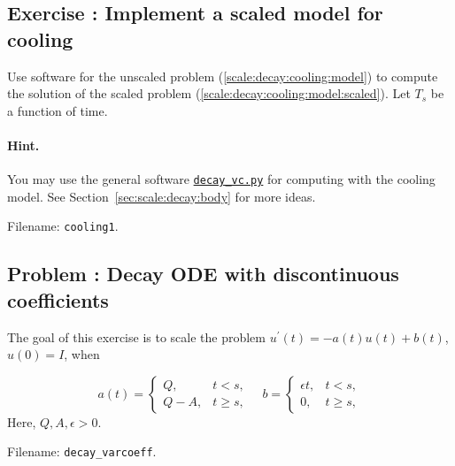 \documentclass[graybox,envcountchap,sectrefs,final]{svmonodo}
\newenvironment{doconceexercise}{}{}
\newcounter{doconceexercisecounter}
\begin{document}
\begin{doconceexercise}

\subsection*{Exercise \thedoconceexercisecounter: Implement a scaled model for cooling}

\label{sec:scale:exer:decay:cooling}

Use software for the unscaled problem (\ref{scale:decay:cooling:model})
to compute the solution of the
scaled problem (\ref{scale:decay:cooling:model:scaled}).
Let $T_s$ be a function of time.


\paragraph{Hint.}
You may use the general software \href{{http://tinyurl.com/o8pb3yy/decay_vc.py}}{\nolinkurl{decay_vc.py}}
for computing with the cooling model.
See Section~\ref{sec:scale:decay:body} for more ideas.



\noindent Filename: \texttt{cooling1}.

\end{doconceexercise}




\begin{doconceexercise}

\subsection*{Problem \thedoconceexercisecounter: Decay ODE with discontinuous coefficients}

\label{scale:decay:exer:decay:step}

The goal of this exercise is to scale the problem
$u^{\prime}(t) = -a(t)u(t) + b(t)$, $u(0)=I$, when

\[
a(t) =\left\lbrace\begin{array}{ll}
Q, & t < s,\\ 
Q - A, & t\geq s,\end{array}\right.
\quad b = \left\lbrace\begin{array}{ll}
\epsilon t, & t < s,\\ 
0, & t\geq s,\end{array}\right.
\]
Here, $Q,A,\epsilon >0$.


\noindent Filename: \Verb!decay_varcoeff!.

\end{doconceexercise}
\end{document}
